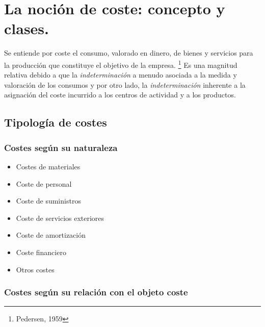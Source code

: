 \documentclass[12pt]{report} %
\providecommand{\tightlist}{%
  \setlength{\itemsep}{0pt}\setlength{\parskip}{0pt}}
\begin{document}
\hypertarget{la-nociuxf3n-de-coste-concepto-y-clases.}{%
\section{La noción de coste: concepto y
clases.}\label{la-nociuxf3n-de-coste-concepto-y-clases.}}

\begin{definicion}[Coste]
Se entiende por coste el consumo, valorado en dinero, de bienes y servicios para la producción que constituye el objetivo de la empresa. \footnote{Pedersen, 1959} Es una magnitud relativa debido a que la \textit{indeterminación} a menudo asociada a la medida y valoración de los consumos y por otro lado, la \textit{indeterminación} inherente a la asignación del coste incurrido a los centros de actividad y a los productos.
\end{definicion}

\hypertarget{tipologuxeda-de-costes}{%
\subsection{Tipología de costes}\label{tipologuxeda-de-costes}}

\hypertarget{costes-seguxfan-su-naturaleza}{%
\subsubsection{Costes según su
naturaleza}\label{costes-seguxfan-su-naturaleza}}

\begin{itemize}
\tightlist
\item
  Costes de materiales
\item
  Coste de personal
\item
  Coste de suministros
\item
  Coste de servicios exteriores
\item
  Coste de amortización
\item
  Coste financiero
\item
  Otros costes
\end{itemize}

\hypertarget{costes-seguxfan-su-relaciuxf3n-con-el-objeto-coste}{%
\subsubsection{Costes según su relación con el objeto
coste}\label{costes-seguxfan-su-relaciuxf3n-con-el-objeto-coste}}
\end{document}
